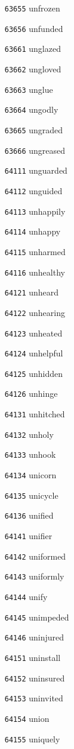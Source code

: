\documentclass[twoside,11pt]{article}
\begin{document}
\begin{multicols}{5}
\begin{enumerate}
\item[\texttt{63655}] unfrozen
\item[\texttt{63656}] unfunded
\item[\texttt{63661}] unglazed
\item[\texttt{63662}] ungloved
\item[\texttt{63663}] unglue
\item[\texttt{63664}] ungodly
\item[\texttt{63665}] ungraded
\item[\texttt{63666}] ungreased
\item[\texttt{64111}] unguarded
\item[\texttt{64112}] unguided
\item[\texttt{64113}] unhappily
\item[\texttt{64114}] unhappy
\item[\texttt{64115}] unharmed
\item[\texttt{64116}] unhealthy
\item[\texttt{64121}] unheard
\item[\texttt{64122}] unhearing
\item[\texttt{64123}] unheated
\item[\texttt{64124}] unhelpful
\item[\texttt{64125}] unhidden
\item[\texttt{64126}] unhinge
\item[\texttt{64131}] unhitched
\item[\texttt{64132}] unholy
\item[\texttt{64133}] unhook
\item[\texttt{64134}] unicorn
\item[\texttt{64135}] unicycle
\item[\texttt{64136}] unified
\item[\texttt{64141}] unifier
\item[\texttt{64142}] uniformed
\item[\texttt{64143}] uniformly
\item[\texttt{64144}] unify
\item[\texttt{64145}] unimpeded
\item[\texttt{64146}] uninjured
\item[\texttt{64151}] uninstall
\item[\texttt{64152}] uninsured
\item[\texttt{64153}] uninvited
\item[\texttt{64154}] union
\item[\texttt{64155}] uniquely

\end{enumerate}
\end{multicols}
\end{document}
